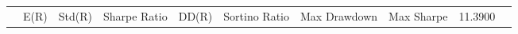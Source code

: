 \begin{tabular}{lrrrrrrrrr}
 & E(R) & Std(R) & Sharpe Ratio & DD(R) & Sortino Ratio & Max Drawdown & %
Max Sharpe & 11.3900%
\end{tabular}
